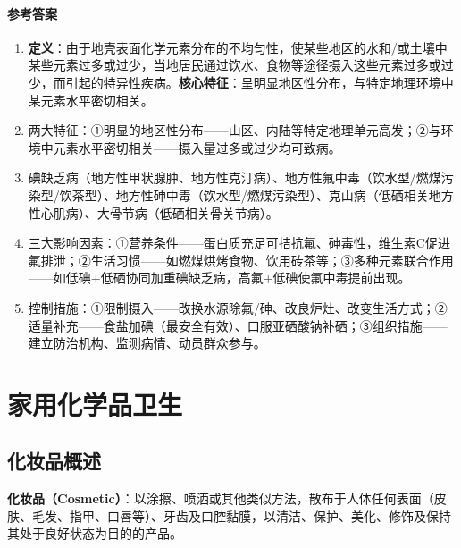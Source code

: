 \documentclass[10pt,a4paper,oneside]{ctexbook}
\begin{document}
\subsubsection*{参考答案}
\begin{enumerate}[leftmargin=*, itemsep=5pt]
    \item \textbf{定义}：由于地壳表面化学元素分布的不均匀性，使某些地区的水和/或土壤中某些元素过多或过少，当地居民通过饮水、食物等途径摄入这些元素过多或过少，而引起的特异性疾病。\textbf{核心特征}：呈明显地区性分布，与特定地理环境中某元素水平密切相关。
    \item 两大特征：①明显的地区性分布——山区、内陆等特定地理单元高发；②与环境中元素水平密切相关——摄入量过多或过少均可致病。
    \item 碘缺乏病（地方性甲状腺肿、地方性克汀病）、地方性氟中毒（饮水型/燃煤污染型/饮茶型）、地方性砷中毒（饮水型/燃煤污染型）、克山病（低硒相关地方性心肌病）、大骨节病（低硒相关骨关节病）。
    \item 三大影响因素：①营养条件——蛋白质充足可拮抗氟、砷毒性，维生素C促进氟排泄；②生活习惯——如燃煤烘烤食物、饮用砖茶等；③多种元素联合作用——如低碘+低硒协同加重碘缺乏病，高氟+低碘使氟中毒提前出现。
    \item 控制措施：①限制摄入——改换水源除氟/砷、改良炉灶、改变生活方式；②适量补充——食盐加碘（最安全有效）、口服亚硒酸钠补硒；③组织措施——建立防治机构、监测病情、动员群众参与。
\end{enumerate}

\newpage

\chapter{家用化学品卫生}
\setcounter{chapter}{9}

\section{化妆品概述}

\begin{defbox}
\textbf{化妆品（Cosmetic）}：以涂擦、喷洒或其他类似方法，散布于人体任何表面（皮肤、毛发、指甲、口唇等）、牙齿及口腔黏膜，以清洁、保护、美化、修饰及保持其处于良好状态为目的的产品。
\end{defbox}
\end{document}
